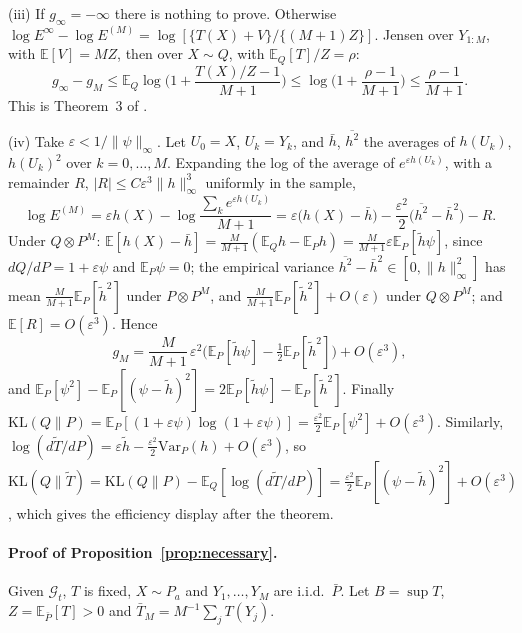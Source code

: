 \documentclass[pdflatex,sn-mathphys-ay]{sn-jnl}
\newcommand{\E}{\mathbb{E}}
\newcommand{\KL}{\mathrm{KL}}
\newcommand{\G}{\mathcal{G}}
\theoremstyle{thmstyleone}
\theoremstyle{thmstyletwo}
\begin{document}
\begin{appendices}
(iii) If $g_\infty = -\infty$ there is nothing to prove. Otherwise
$\log E^\infty - \log E^{(M)} = \log[\{T(X) + V\}/\{(M+1)Z\}]$. Jensen over
$Y_{1:M}$, with $\E[V] = MZ$, then over $X \sim Q$, with $\E_Q[T]/Z = \rho$:
\[
g_\infty - g_M \le \E_Q\log\Big(1 + \frac{T(X)/Z - 1}{M+1}\Big)
\le \log\Big(1 + \frac{\rho - 1}{M+1}\Big) \le \frac{\rho-1}{M+1}.
\]
This is Theorem~3 of \citet{dombowsky2026besag}.

(iv) Take $\varepsilon < 1/\|\psi\|_\infty$. Let $U_0 = X$, $U_k = Y_k$, and
$\bar h$, $\overline{h^2}$ the averages of $h(U_k)$, $h(U_k)^2$ over
$k = 0, \ldots, M$. Expanding the log of the average of $e^{\varepsilon h(U_k)}$,
with a remainder $R$, $|R| \le C\varepsilon^3\|h\|_\infty^3$ uniformly in the sample,
\[
\log E^{(M)} = \varepsilon h(X) - \log\frac{\sum_k e^{\varepsilon h(U_k)}}{M+1}
= \varepsilon\big(h(X) - \bar h\big) - \frac{\varepsilon^2}{2}\big(\overline{h^2} - \bar h^2\big) - R .
\]
Under $Q \otimes P^M$: $\E[h(X) - \bar h] = \frac{M}{M+1}(\E_Q h - \E_P h)
= \frac{M}{M+1}\varepsilon\E_P[\tilde h\psi]$, since $dQ/dP = 1+\varepsilon\psi$
and $\E_P\psi = 0$; the empirical variance $\overline{h^2} - \bar h^2 \in [0, \|h\|_\infty^2]$
has mean $\frac{M}{M+1}\E_P[\tilde h^2]$ under $P \otimes P^M$, and
$\frac{M}{M+1}\E_P[\tilde h^2] + O(\varepsilon)$ under $Q \otimes P^M$; and
$\E[R] = O(\varepsilon^3)$. Hence
\[
g_M = \frac{M}{M+1}\,\varepsilon^2\Big(\E_P[\tilde h\psi] - \tfrac12\E_P[\tilde h^2]\Big) + O(\varepsilon^3),
\]
and $\E_P[\psi^2] - \E_P[(\psi - \tilde h)^2] = 2\E_P[\tilde h\psi] - \E_P[\tilde h^2]$.
Finally $\KL(Q\|P) = \E_P[(1 + \varepsilon\psi)\log(1 + \varepsilon\psi)]
= \frac{\varepsilon^2}{2}\E_P[\psi^2] + O(\varepsilon^3)$. Similarly,
$\log(d\tilde T/dP) = \varepsilon\tilde h - \frac{\varepsilon^2}{2}\mathrm{Var}_P(h)
+ O(\varepsilon^3)$, so
$\KL(Q\|\tilde T) = \KL(Q\|P) - \E_Q[\log(d\tilde T/dP)]
= \frac{\varepsilon^2}{2}\E_P[(\psi - \tilde h)^2] + O(\varepsilon^3)$, which
gives the efficiency display after the theorem.

\paragraph{Proof of Proposition~\ref{prop:necessary}.}
Given $\G_t$, $T$ is fixed, $X \sim P_a$ and $Y_1, \ldots, Y_M$ are i.i.d.\
$\bar P$. Let $B = \sup T$, $Z = \E_{\bar P}[T] > 0$ and
$\bar T_M = M^{-1}\sum_j T(Y_j)$.


\end{appendices}
\end{document}
